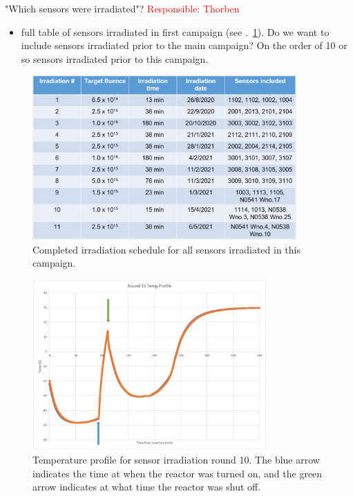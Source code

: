 \label{subsec:sensors_irradiation}
"Which sensors were irradiated"? \textcolor{red}{Responsible: Thorben}
\begin{itemize}
  \item full table of sensors irradiated in first campaign (see .~\ref{fig:Irradiation_Schedule}). Do we want to include sensors irradiated prior to the main campaign? On the order of 10 or so sensors irradiated prior to this campaign.
\end{itemize}

\begin{figure}[!hbt]
  \begin{center}
    \includegraphics[width=0.90\textwidth]{figures/Completed_Irradiation_Schedule_at_RINSC}
    \caption{Completed irradiation schedule for all sensors irradiated in this campaign.}
    \label{fig:Irradiation_Schedule}
  \end{center}
\end{figure}



\begin{figure}[!hbt]
  \begin{center}
    \includegraphics[width=0.80\textwidth]{figures/Round_10_Temperature_Profile}
    \caption{Temperature profile for sensor irradiation round 10. The blue arrow indicates the time at when the reactor was turned on, and the green arrow indicates at what time the reactor was shut off.}
    \label{fig:Round_10_Temperature_Profile}
  \end{center}
\end{figure}

